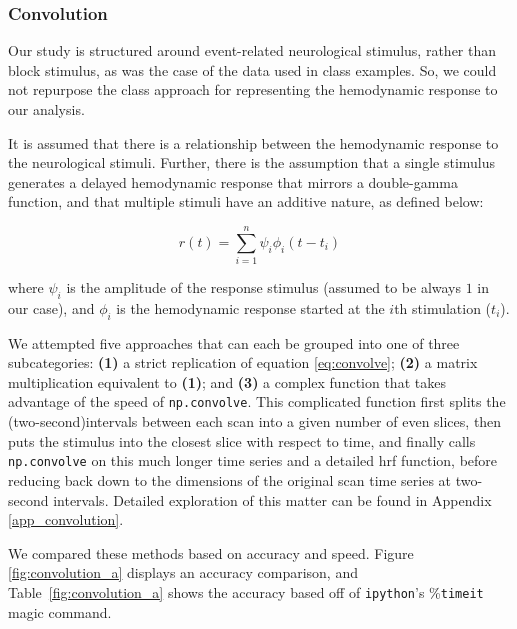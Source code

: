 \subsubsection{Convolution}
\par \indent Our study is structured around event-related neurological 
stimulus, rather than block stimulus, as was the case of the data used in 
class examples. So, we could not repurpose the class approach for 
representing the hemodynamic response to our analysis. 

\par It is assumed that there is a relationship between the hemodynamic 
response to the neurological stimuli. Further, there is the assumption that 
a single stimulus generates a delayed hemodynamic response that mirrors a 
double-gamma function, and that multiple stimuli have an additive nature, as 
defined below: 

\begin{equation} \label{eq:convolve}
r(t)= \sum_{i=1}^n \psi_{i} \phi_{i}(t-t_i)
\end{equation}

\noindent where $\psi_i$ is the amplitude of the response stimulus (assumed to 
be always $1$ in our case), and $\phi_{i}$ is the hemodynamic response started 
at the $i$th stimulation ($t_i$).

\par We attempted five approaches that can each be grouped into one of three 
subcategories: \textbf{(1)} a strict replication of equation 
\ref{eq:convolve}; \textbf{(2)} a matrix multiplication equivalent to 
\textbf{(1)}; and \textbf{(3)} a complex function that takes advantage of the 
speed of \texttt{np.convolve}. This complicated function first splits the 
(two-second)intervals between each scan into a given number of even slices, 
then puts the stimulus into the closest slice with respect to time, and 
finally calls \texttt{np.convolve} on this much longer time series and a 
detailed hrf function, before reducing back down to the dimensions of the 
original scan time series at two-second intervals. Detailed exploration of 
this matter can be found in Appendix \ref{app_convolution}.

We compared these methods based on accuracy and speed. Figure 
\ref{fig:convolution_a} displays an accuracy comparison, and 
Table~\ref{fig:convolution_a} shows the accuracy based off of 
\texttt{ipython}'s \%\texttt{timeit} magic command.



